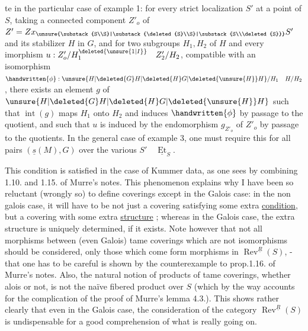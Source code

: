 
te in the particular case of example 1: for every strict localization $S'$ at a point of $S$, taking a connected component $Z'_o$ of $Z'=Zx_{\unsure{\substack{S\\S}|\substack{\deleted{S}\\S}|\substack{S\\\deleted{S}}}}S'$ and its stabilizer $H$ in $G$, and for two  subgroups $H_1,H_2$ of $H$ and every imorphism $u:Z'_o/H_1^{\deleted{\unsure{1|I}}}\quad Z'_2/H_2$,  compatible with an isomorphism $\handwritten{\phi}:\unsure{H|\deleted{G}H|\deleted{H}G|\deleted{\unsure{H}}H}/H_1\quad H/H_2$, there exists an element $g$ of $\unsure{H|\deleted{G}H|\deleted{H}G|\deleted{\unsure{H}}H}$ such that $\operatorname{int}(g)$ maps $H_1$ onto $H_2$ and induces $\handwritten{\phi}$ by passage to the quotient, and such that $u$ is induced by the endomorphism $g_{Z'_o}$ of $Z'_o$ by passage to the quotients. In the general case of example 3, one must require this for all pairs $(\underline{s}(M),G)$ over the various $S'\quad\underline{\operatorname{Et}}_S$.

This condition is satisfied in the case of Kummer data, as one sees by combining 1.10. and 1.15. of Murre's notes. This phenomenon explains why I have been so reluctant (wrongly so) to define  coverings except in the Galois case: in the non galois case, it will have to be not just a covering satisfying some extra \uline{condition}, but a covering with some extra \uline{structure} ; whereas in the Galois case, the extra structure is uniquely determined, if it exists. Note however that  not all morphisms  between (even Galois) tame coverings which are not isomorphisms should be considered, only those which come form morphisms in $\operatorname{Rev}^{\underline{R}}(S)$, - that one has to be careful is shown by the counterexample to prop.1.16. of Murre's notes. Also, the natural notion of products of tame  coverings, whether alois or not, is not the naïve fibered product over $S$ (which by the way accounts for the complication of the proof of Murre's lemma 4.3.). This shows rather clearly that even in the Galois case, the consideration of the category $\operatorname{Rev}^{\underline{R}}(S)$ is undispensable for a good comprehension of what is really going on.
